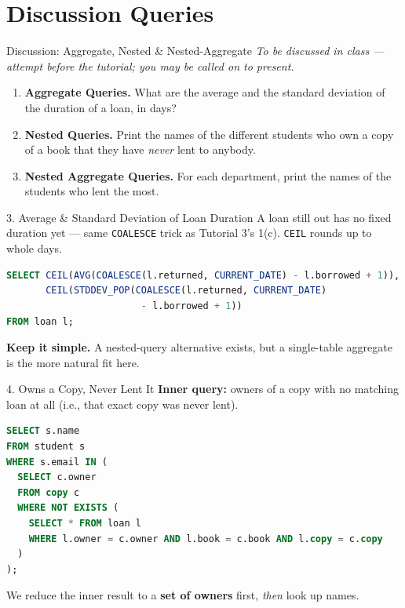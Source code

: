 \documentclass{beamer}
\begin{document}
\section{Discussion Queries}

\begin{frame}{Discussion: Aggregate, Nested \& Nested-Aggregate}
\small
\textit{To be discussed in class --- attempt before the tutorial; you may be called on to present.}
\begin{enumerate}
  \item[\textbf{3.}] \textbf{Aggregate Queries.} What are the average and the standard deviation of the duration of a loan, in days?
  \item[\textbf{4.}] \textbf{Nested Queries.} Print the names of the different students who own a copy of a book that they have \emph{never} lent to anybody.
  \item[\textbf{5.}] \textbf{Nested Aggregate Queries.} For each department, print the names of the students who lent the most.
\end{enumerate}
\end{frame}

\begin{frame}[fragile]{3. Average \& Standard Deviation of Loan Duration}
\small
A loan still out has no fixed duration yet --- same \texttt{COALESCE} trick as Tutorial 3's 1(c). \texttt{CEIL} rounds up to whole days.
\begin{lstlisting}[language=SQL]
SELECT CEIL(AVG(COALESCE(l.returned, CURRENT_DATE) - l.borrowed + 1)),
       CEIL(STDDEV_POP(COALESCE(l.returned, CURRENT_DATE)
                        - l.borrowed + 1))
FROM loan l;
\end{lstlisting}
\textbf{Keep it simple.} A nested-query alternative exists, but a single-table aggregate is the more natural fit here.
\end{frame}

\begin{frame}[fragile]{4. Owns a Copy, Never Lent It}
\small
\textbf{Inner query:} owners of a copy with no matching loan at all (i.e., that exact copy was never lent).
\begin{lstlisting}[language=SQL]
SELECT s.name
FROM student s
WHERE s.email IN (
  SELECT c.owner
  FROM copy c
  WHERE NOT EXISTS (
    SELECT * FROM loan l
    WHERE l.owner = c.owner AND l.book = c.book AND l.copy = c.copy
  )
);
\end{lstlisting}
We reduce the inner result to a \textbf{set of owners} first, \emph{then} look up names.
\end{frame}
\end{document}
